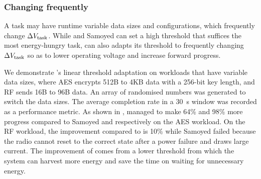 
\subsubsection{Changing frequently}



A task may have runtime variable data sizes and configurations, which frequently change $\Delta V_{\text{task}}$.
While \debs{} and Samoyed can set a high threshold that suffices the most energy-hungry task, \nn can also adapts its threshold to frequently changing $\Delta V_{\text{task}}$ so as to lower operating voltage and increase forward progress.

We demonstrate \nn{}'s linear threshold adaptation on workloads that have variable data sizes, where AES encrypts 512B to 4KB data with a 256-bit key length, and RF sends 16B to 96B data. 
An array of randomised numbers was generated to switch the data sizes. 
The average completion rate in a \SI{30}{\second} window was recorded as a performance metric.
As shown in , \nn{} managed to make 64\% and 98\% more progress compared to Samoyed and \debs{} respectively on the AES workload. On the RF workload, the improvement compared to \debs{} is 10\% while Samoyed failed because the radio cannot reset to the correct state after a power failure and draws large current. 
The improvement of \nn{} comes from a lower threshold from which the system can harvest more energy and save the time on waiting for unnecessary energy. 

